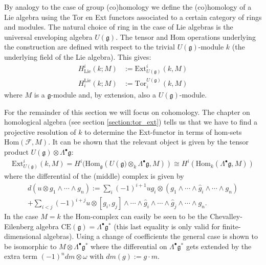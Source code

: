    By analogy to the case of group (co)homology we define the (co)homology of a Lie algebra using the Tor en Ext functors associated to a certain category of rings and modules. The natural choice of ring in the case of Lie algebras is the universal enveloping algebra $U(\mathfrak{g})$. The tensor and Hom operations underlying the construction are defined with respect to the trivial $U(\mathfrak{g})$-module $k$ (the underlying field of the Lie algebra). This gives:
    \begin{align}
        H^i_{\text{Lie}}(k;M) &:= \text{Ext}^i_{U(\mathfrak{g})}(k,M)\\
        H_i^{\text{Lie}}(k;M) &:= \text{Tor}_i^{U(\mathfrak{g})}(k,M)
    \end{align}
    where $M$ is a $\mathfrak{g}$-module and, by extension, also a $U(\mathfrak{g})$-module.

    For the remainder of this section we will focus on cohomology. The chapter on homological algebra (see section \ref{section:tor_ext}) tells us that we have to find a projective resolution of $k$ to determine the Ext-functor in terms of hom-sets $\text{Hom}(\mathcal{F}, M)$. It can be shown that the relevant object is given by the tensor product $U(\mathfrak{g})\otimes\Lambda^\bullet\mathfrak{g}$:
    \begin{gather}
        \text{Ext}^i_{U(\mathfrak{g})}(k, M) = H^i(\text{Hom}_{\mathfrak{g}}(U(\mathfrak{g)}\otimes_k\Lambda^\bullet\mathfrak{g}, M)) \cong H^i(\text{Hom}_k(\Lambda^\bullet\mathfrak{g}, M))
    \end{gather}
    where the differential of the (middle) complex is given by
    \begin{gather}
        d(u\otimes g_1\wedge\cdots\wedge g_n) := \sum_i(-1)^{i+1}ug_i\otimes(g_1\wedge\cdots\wedge\hat{g}_i\wedge\cdots\wedge g_n)\\+ \sum_{i<j}(-1)^{i+j}u\otimes[g_i,g_j]\wedge\cdots\wedge\hat{g}_i\wedge\cdots\wedge\hat{g}_j\wedge\cdots\wedge g_n.\nonumber
    \end{gather}
    In the case $M=k$ the Hom-complex can easily be seen to be the Chevalley-Eilenberg algebra $\text{CE}(\mathfrak{g})=\Lambda^\bullet\mathfrak{g}^*$ (this last equality is only valid for finite-dimensional algebras). Using a change of coefficients the general case is shown to be isomorphic to $M\otimes\Lambda^\bullet\mathfrak{g}^*$ where the differential on $\Lambda^\bullet\mathfrak{g}^*$ gets extended by the extra term $(-1)^n dm\otimes\omega$ with $dm(g):=g\cdot m$.

